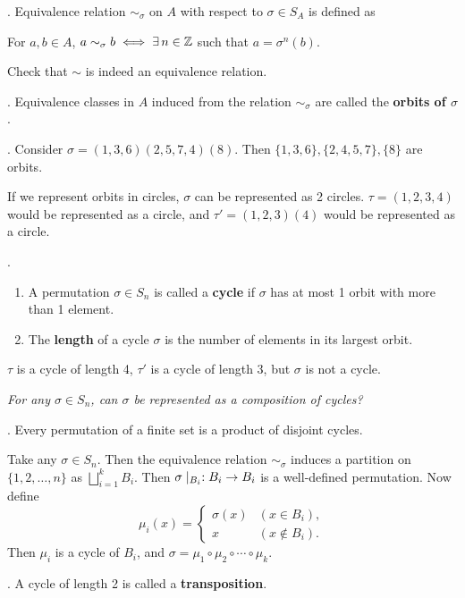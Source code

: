 
. Equivalence relation \(\sim_\sigma\) on \(A\) with respect to \(\sigma \in S_A\) is defined as
\begin{center}
    For \(a, b \in A\), \(a \sim_\sigma b \iff \exists n \in \Z\) such that \(a = \sigma^n(b)\).
\end{center}

\rmk Check that \(\sim\) is indeed an equivalence relation.

. Equivalence classes in \(A\) induced from the relation \(\sim_\sigma\) are called the \textbf{orbits of \(\sigma\)}.

\ex. Consider \(\sigma = (1, 3, 6) (2, 5, 7, 4) (8)\). Then \(\{1, 3, 6\}, \{2, 4, 5, 7\}, \{8\}\) are orbits.

If we represent orbits in circles, \(\sigma\) can be represented as 2 circles. \(\tau = (1, 2, 3, 4)\) would be represented as a circle, and \(\tau' = (1, 2, 3)(4)\) would be represented as a circle.

. 
\begin{enumerate}
    \item A permutation \(\sigma \in S_n\) is called a \textbf{cycle} if \(\sigma\) has at most 1 orbit with more than 1 element.
    \item The \textbf{length} of a cycle \(\sigma\) is the number of elements in its largest orbit.
\end{enumerate}

\(\tau\) is a cycle of length 4, \(\tau'\) is a cycle of length 3, but \(\sigma\) is not a cycle.

\question \textit{For any \(\sigma \in S_n\), can \(\sigma\) be represented as a composition of cycles?}

\thm. Every permutation of a finite set is a product of disjoint cycles.

\pf Take any \(\sigma \in S_n\). Then the equivalence relation \(\sim_\sigma\) induces a partition on \(\{1, 2, \dots, n\}\) as \(\bigsqcup_{i = 1}^k B_i\). Then \(\sigma \mid_{B_i} : B_i \rightarrow B_i\) is a well-defined permutation. Now define
\[
    \mu_i(x) = \begin{cases}
        \sigma(x) & (x \in B_i), \\ x & (x \notin B_i).
    \end{cases}
\]
Then \(\mu_i\) is a cycle of \(B_i\), and \(\sigma = \mu_1 \circ \mu_2 \circ \cdots \circ \mu_k\).

.  A cycle of length 2 is called a \textbf{transposition}.

